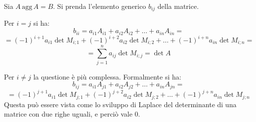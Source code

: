 \begin{newdim}
    Sia $A\,\text{agg}\,A = B$. Si prenda l'elemento generico $b_{ij}$ della matrice. 
    
    Per $i = j$ si ha:
    \[
        b_{ii} = a_{i1}A_{i1} + a_{i2}A_{i2} + \dots + a_{in}A_{in} =
    \]
    \[
        = (-1)^{i + 1} a_{i1} \det M_{i;1} + (-1)^{i + 2} a_{i2} \det M_{i;2} + \dots + (-1)^{i + n} a_{in} \det M_{i;n} = 
    \]
    \[
        = \sum_{j = 1}^{n} a_{ij} \det M_{i;j} = \det A
    \]

    Per $i \neq j$ la questione è più complessa. Formalmente si ha:
    \[
        b_{ij} = a_{i1}A_{j1} + a_{i2}A_{j2} + \dots + a_{in}A_{jn} =
    \]
    \[
        = (-1)^{j + 1} a_{i1} \det M_{j;1} + (-1)^{j + 2} a_{i2} \det M_{j;2} + \dots + (-1)^{j + n} a_{in} \det M_{j;n}
    \]
    Questa può essere vista come lo sviluppo di Laplace del determinante di una matrice con due righe uguali, e perciò vale 0.


\end{newdim}
